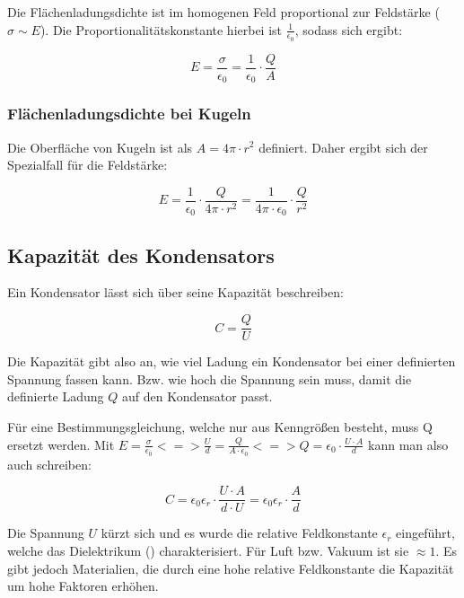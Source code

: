 Die Flächenladungsdichte ist im homogenen Feld proportional zur Feldstärke ($\sigma \sim E$). Die Proportionalitätskonstante hierbei ist $\frac{1}{\epsilon_0}$, sodass sich ergibt:

\begin{equation} \label{eq:feldstaerke_mit_sigma}
	E = \frac{\sigma}{\epsilon_0} = \frac{1}{\epsilon_0} \cdot \frac{Q}{A}
\end{equation}

\subsubsection{Flächenladungsdichte bei Kugeln}

Die Oberfläche von Kugeln ist als $A=4\pi \cdot r^2$ definiert. Daher ergibt sich der Spezialfall für die Feldstärke:

\begin{equation} \label{eq:feldstaerke_kugel}
	E = \frac{1}{\epsilon_0} \cdot \frac{Q}{4\pi \cdot r^2} = \frac{1}{4\pi \cdot \epsilon_0} \cdot \frac{Q}{r^2}
\end{equation}


\subsection{Kapazität des Kondensators}

Ein Kondensator lässt sich über seine Kapazität beschreiben:

\begin{equation}
	C = \frac{Q}{U}
\end{equation}

Die Kapazität gibt also an, wie viel Ladung ein Kondensator bei einer definierten Spannung fassen kann. Bzw. wie hoch die Spannung sein muss, damit die definierte Ladung $Q$ \glqq auf den Kondensator passt\grqq .

Für eine Bestimmungsgleichung, welche nur aus Kenngrößen besteht, muss Q ersetzt werden. Mit $E = \frac{\sigma}{\epsilon_0} <=> \frac{U}{d} = \frac{Q}{A \cdot \epsilon_0} <=> Q = \epsilon_0 \cdot \frac{U \cdot A}{d}$ kann man also auch schreiben:

\begin{equation}
	C = \epsilon_0 \epsilon_r \cdot \frac{U \cdot A}{d \cdot U} = \epsilon_0 \epsilon_r \cdot \frac{A}{d}
\end{equation}

Die Spannung $U$ kürzt sich und es wurde die relative Feldkonstante $\epsilon_r$ eingeführt, welche das Dielektrikum () charakterisiert. Für Luft bzw. Vakuum ist sie $\approx 1$. Es gibt jedoch Materialien, die durch eine hohe relative Feldkonstante die Kapazität um hohe Faktoren erhöhen.

